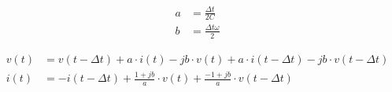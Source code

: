 \begin{align}
        a &= \frac{\Delta t}{2C} \\
        b &= \frac{\Delta t \omega}{2}
\end{align}

\begin{align}
        v(t) &= v(t - \Delta t) + a \cdot i(t) - j b \cdot v(t) + a \cdot i(t - \Delta t) - j b \cdot v(t - \Delta t) \\
        i(t) &= -i(t- \Delta t) + \frac{1+jb}{a} \cdot v(t) + \frac{-1+jb}{a} \cdot v(t - \Delta t)
\end{align}
